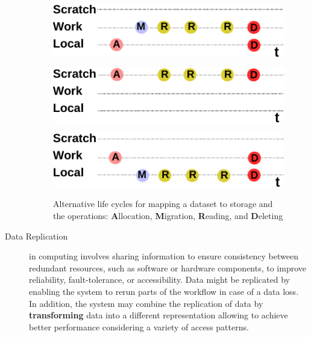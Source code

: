 \documentclass{superfri}
\begin{document}
\begin{description}
\begin{figure}[b]
    \begin{minipage}{.33\linewidth}
        \centering
        \includegraphics[width=0.9\columnwidth]{pic/lifecycle-1}
        \label{fig:lifecycle1}
    \end{minipage}
    \begin{minipage}{.33\linewidth}
        \centering
        \includegraphics[width=0.9\columnwidth]{pic/lifecycle-2}
        \label{fig:lifecycle2}
    \end{minipage}
    \begin{minipage}{.33\linewidth}
        \centering
        \includegraphics[width=0.9\columnwidth]{pic/lifecycle-3}
        \label{fig:lifecycle3}
    \end{minipage}
    \vspace{5pt}
    \caption{Alternative life cycles for mapping a dataset to storage and the operations: \textbf{A}llocation, \textbf{M}igration, \textbf{R}eading, and \textbf{D}eleting}
    \label{fig:lifecycle}
\end{figure}

\item[Data Replication] in computing involves sharing information to ensure consistency between redundant resources, such as software or hardware components, to improve reliability, fault-tolerance, or accessibility.
Data might be replicated by enabling the system to rerun parts of the workflow in case of a data loss.
In addition, the system may combine the replication of data by \textbf{transforming} data into a different representation allowing to achieve better performance considering a variety of access patterns.


\end{description}
\end{document}
